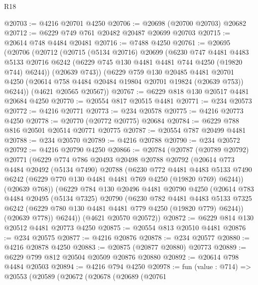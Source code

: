\begin{lexlean}{R18}
\begin{coremodule}
@20703 := @4216 @20701 @4250
@20706 := @20698 (@20700 @20703) @20682
@20712 := @6229 @749 @761 @20482 @20487 @20699 @20703
@20715 := @20614 @748 @4484 @20481
@20716 := @7488 @4250
@20761 := @20695
    (@20706
      (@20712
        (@20715
          (@5134 @20716)
          @20699
          (@6230
            @747
            @4481
            @4483
            @5133
            @20716
            @6242
            (@6229 @745 @130 @4481 @4481 @744 @4250 (@19820 @744) @6244))
          (@20639 @743))
        (@6229
          @759
          @130
          @20485
          @4481
          @20701
          @4250
          (@20614 @758 @4484 @20484 @19804 @20701 @19824 (@20639 @753))
          @6244))
      (@4621 @20565 @20567))
@20767 := @6229 @818 @130 @20517 @4481 @20684 @4250
@20770 := @20554 @817 @20515 @4481
@20771 := @234 @20573
@20772 := @4216 @20771
@20773 := @234 @20578
@20775 := @4216 @20773 @4250
@20778 := @20770 (@20772 @20775) @20684
@20784 := @6229 @788 @816 @20501 @20514 @20771 @20775
@20787 := @20554 @787 @20499 @4481
@20788 := @234 @20570
@20789 := @4216 @20788
@20790 := @234 @20572
@20792 := @4216 @20790 @4250
@20866 := @20784
    (@20787
      (@20789 @20792)
      @20771
      (@6229
        @774
        @786
        @20493
        @20498
        @20788
        @20792
        (@20614
          @773
          @4484
          @20492
          (@5134 @7490)
          @20788
          (@6230
            @772
            @4481
            @4483
            @5133
            @7490
            @6242
            (@6229 @770 @130 @4481 @4481 @769 @4250 (@19820 @769) @6244))
          (@20639 @768))
        (@6229
          @784
          @130
          @20496
          @4481
          @20790
          @4250
          (@20614
            @783
            @4484
            @20495
            (@5134 @7325)
            @20790
            (@6230
              @782
              @4481
              @4483
              @5133
              @7325
              @6242
              (@6229 @780 @130 @4481 @4481 @779 @4250 (@19820 @779) @6244))
            (@20639 @778))
          @6244))
      (@4621 @20570 @20572))
@20872 := @6229 @814 @130 @20512 @4481 @20773 @4250
@20875 := @20554 @813 @20510 @4481
@20876 := @234 @20575
@20877 := @4216 @20876
@20878 := @234 @20577
@20880 := @4216 @20878 @4250
@20883 := @20875 (@20877 @20880) @20773
@20889 := @6229 @799 @812 @20504 @20509 @20876 @20880
@20892 := @20614 @798 @4484 @20503
@20894 := @4216 @794 @4250
@20978 := fun (value : @714) =>
  @20553
    (@20589
      (@20672
        (@20678
          (@20689
            (@20761

\end{coremodule}
\end{lexlean}
